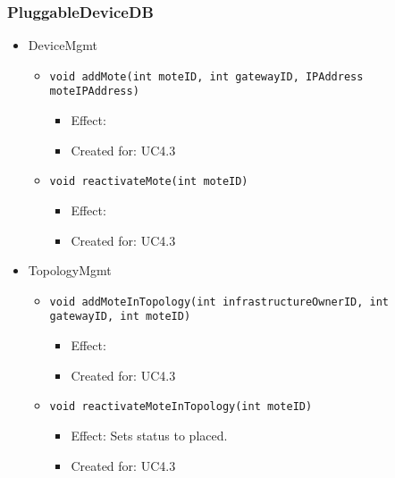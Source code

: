     \subsubsection{PluggableDeviceDB}
        \begin{itemize}
        	\item DeviceMgmt
        	\begin{itemize}
        		\item \texttt{void addMote(int moteID, int gatewayID, IPAddress moteIPAddress)}
        		\begin{itemize}
        			\item Effect:
        			\item Created for: UC4.3
        		\end{itemize}
                \item \texttt{void reactivateMote(int moteID)}
                    \begin{itemize}
                        \item Effect:
                        \item Created for: UC4.3
                    \end{itemize}
        	\end{itemize}

        	\item TopologyMgmt
        	\begin{itemize}
        		\item \texttt{void addMoteInTopology(int infrastructureOwnerID, int gatewayID, int moteID)}
        		\begin{itemize}
        			\item Effect:
        			\item Created for: UC4.3
        		\end{itemize}
                \item \texttt{void reactivateMoteInTopology(int moteID)}
                    \begin{itemize}
                        \item Effect: Sets status to placed.
                        \item Created for: UC4.3
                    \end{itemize}
        	\end{itemize}

        \end{itemize}

